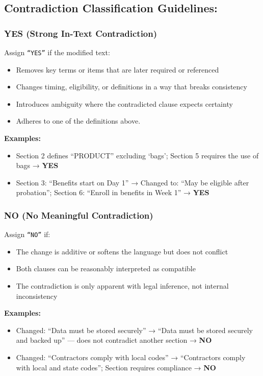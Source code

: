 \documentclass[11pt]{article}
\begin{document}
\begin{tcolorbox}[breakable,colback=lightestgray,colframe=black,title=\textbf{In-Text LLM Validation Prompt}]
\subsection*{\textbf{Contradiction Classification Guidelines:}}

\subsubsection*{\textbf{YES (Strong In-Text Contradiction)}}
Assign \texttt{``YES''} if the modified text:
\begin{itemize}
    \item Removes key terms or items that are later required or referenced
    \item Changes timing, eligibility, or definitions in a way that breaks consistency
    \item Introduces ambiguity where the contradicted clause expects certainty
    \item Adheres to one of the definitions above.
\end{itemize}

\textbf{Examples:}
\begin{itemize}
    \item Section 2 defines ``PRODUCT'' excluding `bags'; Section 5 requires the use of bags → \textbf{YES}
    \item Section 3: ``Benefits start on Day 1'' → Changed to: ``May be eligible after probation''; Section 6: ``Enroll in benefits in Week 1'' → \textbf{YES}
\end{itemize}

\subsubsection*{\textbf{NO (No Meaningful Contradiction)}}
Assign \texttt{``NO''} if:
\begin{itemize}
    \item The change is additive or softens the language but does not conflict
    \item Both clauses can be reasonably interpreted as compatible
    \item The contradiction is only apparent with legal inference, not internal inconsistency
\end{itemize}

\textbf{Examples:}
\begin{itemize}
    \item Changed: ``Data must be stored securely'' → ``Data must be stored securely and backed up'' — does not contradict another section → \textbf{NO}
    \item Changed: ``Contractors comply with local codes'' → ``Contractors comply with local and state codes''; Section requires compliance → \textbf{NO}
\end{itemize}


\end{tcolorbox}
\end{document}
